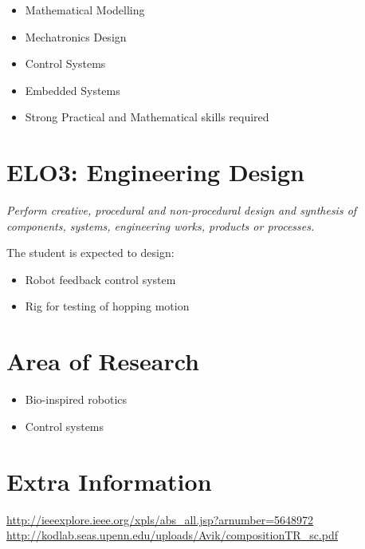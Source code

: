 \begin{itemize}
\item Mathematical Modelling 
\item Mechatronics Design
\item Control Systems
\item Embedded Systems
\item Strong Practical and Mathematical skills required
\end{itemize}

\section*{ELO3: Engineering Design}

\textit{Perform creative, procedural and non-procedural design and synthesis of components, systems, engineering works, products or processes.}

The student is expected to design:

\begin{itemize}
\item Robot feedback control system
\item Rig for testing of hopping motion
\end{itemize}

\section*{Area of Research}

\begin{itemize}
\item Bio-inspired robotics
\item Control systems
\end{itemize}

\section*{Extra Information}

\url{http://ieeexplore.ieee.org/xpls/abs_all.jsp?arnumber=5648972}
\url{http://kodlab.seas.upenn.edu/uploads/Avik/compositionTR_sc.pdf}
